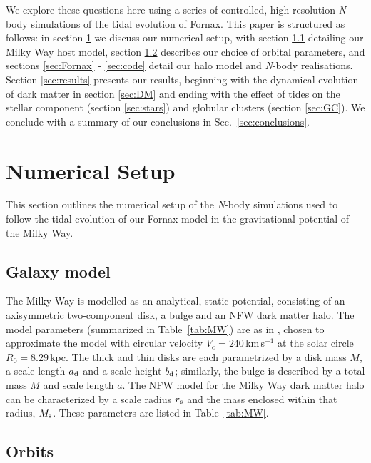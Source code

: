 \documentclass[fleqn,usenatbib]{mnras}
\begin{document}
We explore these questions here using a series of controlled, high-resolution \textit{N}-body simulations of the tidal evolution of Fornax. This paper is structured as follows: in section \ref{sec:methods} we discuss our numerical setup, with section \ref{sec:host} detailing our Milky Way host model, section \ref{sec:orbits} describes our choice of orbital parameters, and sections \ref{sec:Fornax} - \ref{sec:code} detail our halo model and \textit{N}-body realisations. Section \ref{sec:results} presents our results, beginning with the dynamical evolution of dark matter in section \ref{sec:DM} and ending with the effect of tides on the stellar component (section \ref{sec:stars}) and globular clusters (section \ref{sec:GC}). We conclude with a summary of our conclusions in Sec.~\ref{sec:conclusions}.

\section{Numerical Setup}
\label{sec:methods}

This section outlines the numerical setup of the \textit{N}-body simulations used to follow the tidal evolution of our Fornax model in the gravitational potential of the Milky Way.

\subsection{Galaxy model}
\label{sec:host}

The Milky Way is modelled as an analytical, static potential, consisting of an axisymmetric two-component \citet{Miyamoto1975} disk, a \citet{Hernquist1990} bulge and an NFW dark matter halo. The model parameters (summarized in Table~\ref{tab:MW}) are as in \citet{Errani2020}, chosen to approximate the \citet{McMillan2011} model with circular velocity $V_\mathrm{c} = 240$\,km\,s$^{-1}$ at the solar circle $R_0 = 8.29$\,kpc. The thick and thin disks are each parametrized by a disk mass $M$, a scale length $a_{\rm d}$ and a scale height $b_{\rm d}$; similarly, the bulge is described by a total mass $M$ and scale length $a$. The NFW model for the Milky Way dark matter halo can be characterized by a scale radius $r_{\rm s}$ and the mass enclosed within that radius, $M_{\rm s}$. These parameters are listed in Table~\ref{tab:MW}.

\subsection{Orbits}
\label{sec:orbits}
\end{document}
